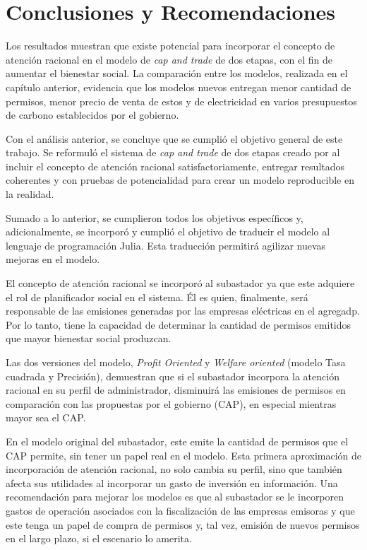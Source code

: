 \chapter{Conclusiones y Recomendaciones}
\label{c5} %

Los resultados muestran que existe potencial para incorporar el concepto de atención racional en el modelo de \textit{cap and trade} de dos etapas, con el fin de aumentar el bienestar social. La comparación entre los modelos, realizada en el capítulo anterior, evidencia que los modelos nuevos entregan menor cantidad de permisos, menor precio de venta de estos y de electricidad en varios presupuestos de carbono establecidos por el gobierno.
\vspace{2.5mm}

Con el análisis anterior, se concluye que se cumplió el objetivo general de este trabajo. Se reformuló el sistema de \textit{cap and trade} de dos etapas creado por  al incluir el concepto de atención racional satisfactoriamente, entregar resultados coherentes y con pruebas de potencialidad para crear un modelo reproducible en la realidad.
\vspace{2.5mm}

Sumado a lo anterior, se cumplieron todos los objetivos específicos y, adicionalmente, se incorporó y cumplió el objetivo de traducir el modelo al lenguaje de programación Julia. Esta traducción permitirá agilizar nuevas mejoras en el modelo. 
\vspace{2.5mm}

El concepto de atención racional se incorporó al subastador ya que este adquiere el rol de planificador social en el sistema. Él es quien, finalmente, será responsable de las emisiones generadas por las empresas eléctricas en el agregadp. Por lo tanto, tiene la capacidad de determinar la cantidad de permisos emitidos que mayor bienestar social produzcan.
\vspace{2.5mm}

Las dos versiones del modelo, \textit{Profit Oriented} y \emph{Welfare oriented} (modelo Tasa cuadrada y Precisión), demuestran que si el subastador incorpora la atención racional en su perfil de administrador,  disminuirá las emisiones de permisos en comparación con las propuestas por el gobierno (CAP), en especial mientras mayor sea el CAP. 
\vspace{2.5mm}

En el modelo original del subastador, este emite la cantidad de permisos que el CAP permite, sin tener un papel real en el modelo. Esta primera aproximación de incorporación de atención racional, no solo cambia su perfil, sino que también afecta sus utilidades al incorporar un gasto de inversión en información. Una recomendación para mejorar los modelos es que al subastador se le incorporen gastos de operación asociados con la fiscalización de las empresas emisoras y que este tenga un papel de compra de permisos y, tal vez, emisión de nuevos permisos en el largo plazo, si el escenario lo amerita.
\vspace{2.5mm}

